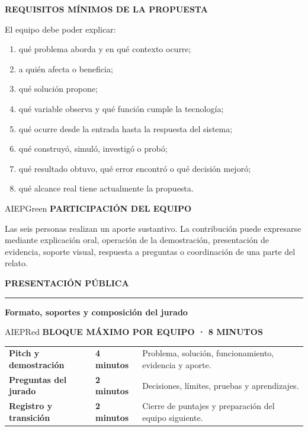 \documentclass[10pt,a4paper]{article}
\newcommand{\kicker}[1]{%
  {\color{AIEPRed}\scriptsize\bfseries\MakeUppercase{#1}}\par\vspace{2.4mm}
  {\color{AIEPRed}\rule{13mm}{1.2pt}}\vspace{3mm}
}
\newcommand{\labeltext}[1]{%
  {\scriptsize\bfseries\color{AIEPSlate}\MakeUppercase{#1}}\par\vspace{1.2mm}
}
\begin{document}
\begin{card}
\labeltext{Requisitos mínimos de la propuesta}
El equipo debe poder explicar:
\begin{enumerate}
  \item qué problema aborda y en qué contexto ocurre;
  \item a quién afecta o beneficia;
  \item qué solución propone;
  \item qué variable observa y qué función cumple la tecnología;
  \item qué ocurre desde la entrada hasta la respuesta del sistema;
  \item qué construyó, simuló, investigó o probó;
  \item qué resultado obtuvo, qué error encontró o qué decisión mejoró;
  \item qué alcance real tiene actualmente la propuesta.
\end{enumerate}
\end{card}

\begin{softcard}{AIEPGreen}
\labeltext{Participación del equipo}
Las seis personas realizan un aporte sustantivo. La contribución puede expresarse mediante
explicación oral, operación de la demostración, presentación de evidencia, soporte visual,
respuesta a preguntas o coordinación de una parte del relato.
\end{softcard}

\newpage
\kicker{Presentación pública}
{\LARGE\bfseries\color{AIEPNavy} Formato, soportes y composición del jurado}\par
\vspace{4mm}

\begin{softcard}{AIEPRed}
\labeltext{Bloque máximo por equipo · 8 minutos}
\begin{tabularx}{\textwidth}{@{}L{50mm}C{34mm}Y@{}}
\textbf{Pitch y demostración} & \textbf{4 minutos} & Problema, solución, funcionamiento, evidencia y aporte.\\
\textbf{Preguntas del jurado} & \textbf{2 minutos} & Decisiones, límites, pruebas y aprendizajes.\\
\textbf{Registro y transición} & \textbf{2 minutos} & Cierre de puntajes y preparación del equipo siguiente.\\
\end{tabularx}
\end{softcard}
\end{document}
